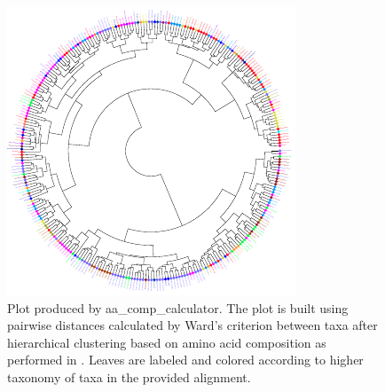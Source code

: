 \documentclass{article}
\begin{document}
        \begin{figure}[H]
        \centering
        \includegraphics[width=\linewidth]{figures/aa_comp_calculator.pdf}
        \caption{Plot produced by aa\_comp\_calculator. The plot is built using pairwise distances calculated by Ward’s criterion between taxa after hierarchical clustering based on amino acid composition as performed in \cite{brown_phylogenomics_2018}. Leaves are labeled and colored according to higher taxonomy of taxa in the provided alignment.}
        \label{Fig:aahclust}
        \end{figure}
        
        \vspace{0.5cm}
        
\end{document}
